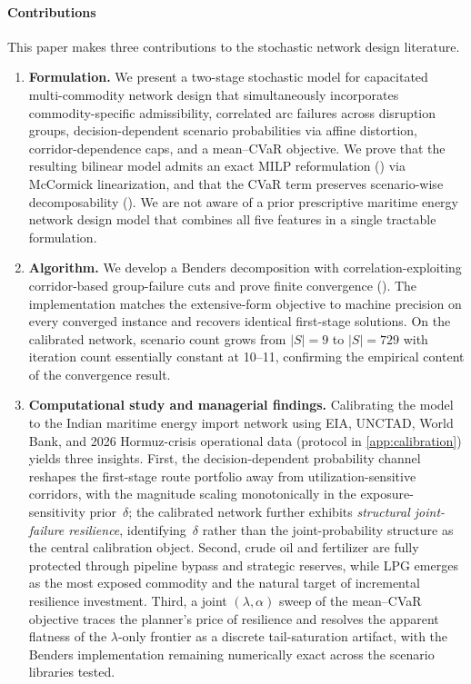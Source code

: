 \documentclass[final,3p,authoryear]{elsarticle}
\theoremstyle{definition}
\begin{document}
\paragraph{Contributions}
This paper makes three contributions to the stochastic network design literature.

\begin{enumerate}[leftmargin=2em, itemsep=0.3em]
    \item \textbf{Formulation.} We present a two-stage stochastic model
    for capacitated multi-commodity network design that simultaneously
    incorporates commodity-specific admissibility, correlated arc
    failures across disruption groups, decision-dependent scenario
    probabilities via affine distortion, corridor-dependence caps, and
    a mean--CVaR objective. We prove that the resulting bilinear model
    admits an exact MILP reformulation
    () via McCormick linearization,
    and that the CVaR term preserves scenario-wise decomposability
    (). We are not aware of a prior prescriptive
    maritime energy network design model that combines all five features
    in a single tractable formulation.

    \item \textbf{Algorithm.} We develop a Benders decomposition with
    correlation-exploiting corridor-based group-failure cuts and prove
    finite convergence (). The implementation
    matches the extensive-form objective to machine precision on every
    converged instance and recovers identical first-stage solutions.
    On the calibrated network, scenario count grows from $|S|=9$ to
    $|S|=729$ with iteration count essentially constant at 10--11,
    confirming the empirical content of the convergence result.

    \item \textbf{Computational study and managerial findings.}
    Calibrating the model to the Indian maritime energy import network
using EIA, UNCTAD, World Bank, and 2026 Hormuz-crisis operational data
(protocol in \ref{app:calibration}) yields three insights. First, the
decision-dependent probability channel reshapes the first-stage route
portfolio away from utilization-sensitive corridors, with the magnitude
scaling monotonically in the exposure-sensitivity prior~$\delta$; the
calibrated network further exhibits \emph{structural joint-failure
resilience}, identifying~$\delta$ rather than the joint-probability
structure as the central calibration object. Second, crude oil and
fertilizer are fully protected through pipeline bypass and strategic
reserves, while LPG emerges as the most exposed commodity and the
natural target of incremental resilience investment. Third, a joint
$(\lambda,\alpha)$ sweep of the mean--CVaR objective traces the
planner's price of resilience and resolves the apparent flatness of
the $\lambda$-only frontier as a discrete tail-saturation artifact,
with the Benders implementation remaining numerically exact across the
scenario libraries tested.


\end{enumerate}
\end{document}
